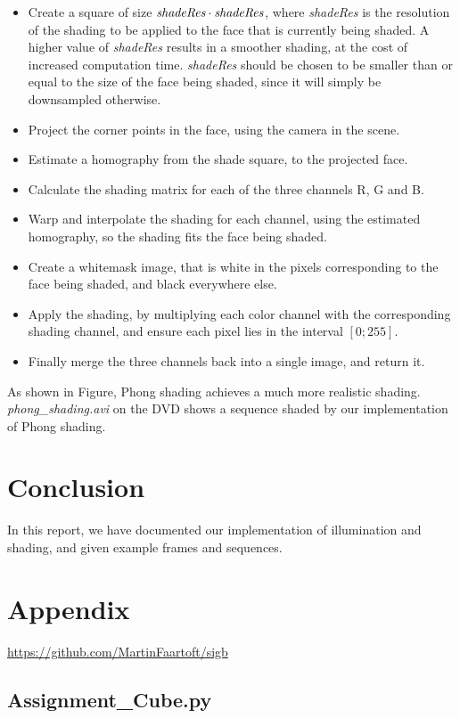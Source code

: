 \documentclass[a4paper,11pt]{article}
\begin{document}
\begin{itemize}
\item Create a square of size $\emph{shadeRes} \cdot \emph{shadeRes}$, where \emph{shadeRes} is the resolution of the shading to be applied to the face that is currently being shaded. A higher value of \emph{shadeRes} results in a smoother shading, at the cost of increased computation time. \emph{shadeRes} should be chosen to be smaller than or equal to the size of the face being shaded, since it will simply be downsampled otherwise.

\item Project the corner points in the face, using the camera in the scene.

\item Estimate a homography from the shade square, to the projected face.

\item Calculate the shading matrix for each of the three channels R, G and B.

\item Warp and interpolate the shading for each channel, using the estimated homography, so the shading fits the face being shaded.

\item Create a whitemask image, that is white in the pixels corresponding to the face being shaded, and black everywhere else.

\item Apply the shading, by multiplying each color channel with the corresponding shading channel, and ensure each pixel lies in the interval $[0;255]$.

\item Finally merge the three channels back into a single image, and return it.
\end{itemize}


As shown in Figure, Phong shading achieves a much more realistic shading. \emph{phong\_shading.avi} on the DVD shows a sequence shaded by our implementation of Phong shading.
\section{Conclusion}
In this report, we have documented our implementation of illumination and shading, and given example frames and sequences.
\newpage
\section*{Appendix}
\url{https://github.com/MartinFaartoft/sigb}
\subsection*{Assignment\_Cube.py}

\end{document}
